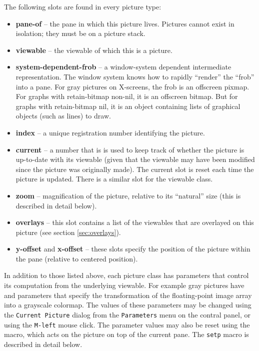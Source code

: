 The following slots are found in every picture type:
\begin{itemize}
\item {\bf pane-of} -- the pane in which this picture lives.  Pictures
cannot exist in isolation; they must be on a picture stack.

\item {\bf viewable} -- the viewable of which this is a picture.

\item {\bf system-dependent-frob} -- a window-system dependent
intermediate representation.  The window system knows how to rapidly
``render'' the ``frob'' into a pane.  For gray pictures on X-screens,
the frob is an offscreen pixmap.  For graphs with retain-bitmap
non-nil, it is an offscreen bitmap.  But for graphs with retain-bitmap
nil, it is an object containing lists of graphical objects (such as
lines) to draw.

\item {\bf index} -- a unique registration number identifying the picture.

\item {\bf current} -- a number that is is used to
keep track of whether the picture is up-to-date with its viewable
(given that the viewable may have been modified since the picture was
originally made).  The current slot is reset each time the picture is
updated.  There is a similar slot for the viewable class.

\item {\bf zoom} -- magnification of the picture, relative to its
``natural'' size (this is described in detail below).

\item {\bf overlays} -- this slot contains a list of the viewables that
are overlayed on this picture (see section \ref{sec:overlays}).

\item {\bf y-offset} and {\bf x-offset} -- these slots specify the
position of the picture within the pane (relative to centered position).

\end{itemize}

In addition to those listed above, each picture class has parameters
that control its computation from the underlying viewable.  For
example gray pictures have  and  parameters
that specify the transformation of the floating-point image array into
a grayscale colormap.  The values of these parameters may be changed
using the {\tt Current Picture} dialog from the {\tt Parameters} menu
on the contral panel, or using the {\tt M-left} mouse click.  The
parameter values may also be reset using the
 macro, which acts on the picture on top of the current
pane.  The {\tt setp} macro is described in detail below.

